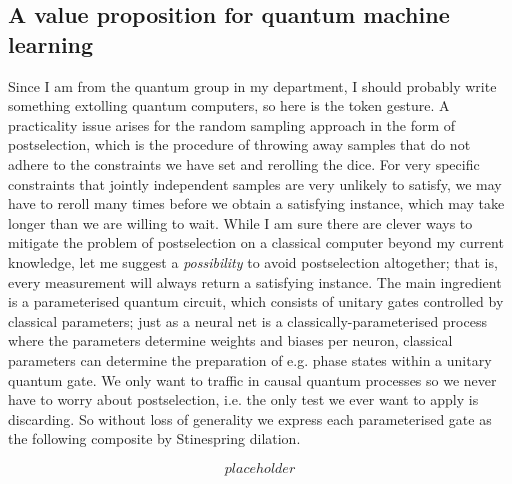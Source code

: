 \begin{fullwidth}
\subsection{A value proposition for quantum machine learning}

Since I am from the quantum group in my department, I should probably write something extolling quantum computers, so here is the token gesture. A practicality issue arises for the random sampling approach in the form of postselection, which is the procedure of throwing away samples that do not adhere to the constraints we have set and rerolling the dice. For very specific constraints that jointly independent samples are very unlikely to satisfy, we may have to reroll many times before we obtain a satisfying instance, which may take longer than we are willing to wait. While I am sure there are clever ways to mitigate the problem of postselection on a classical computer beyond my current knowledge, let me suggest a \emph{possibility} to avoid postselection altogether; that is, every measurement will always return a satisfying instance. The main ingredient is a parameterised quantum circuit, which consists of unitary gates controlled by classical parameters; just as a neural net is a classically-parameterised process where the parameters determine weights and biases per neuron, classical parameters can determine the preparation of e.g. phase states within a unitary quantum gate. We only want to traffic in causal quantum processes so we never have to worry about postselection, i.e. the only test we ever want to apply is discarding. So without loss of generality we express each parameterised gate as the following composite by Stinespring dilation.

\[placeholder\]


\end{fullwidth}
